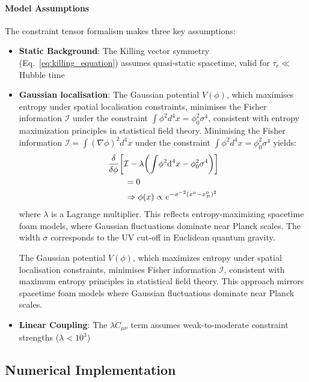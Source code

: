 \documentclass[twocolumn]{article}
\newcommand{\fpit}{\mathcal{P}}
\begin{document}
	\paragraph{Model Assumptions}
	The constraint tensor formalism makes three key assumptions:  
	\begin{itemize}
		\item \textbf{Static Background}: The Killing vector symmetry (Eq.~\ref{eq:killing_equation}) assumes quasi-static spacetime, valid for $\tau_c \ll$ Hubble time  
		\item \textbf{Gaussian localisation}: The Gaussian potential \(V(\phi)\), which maximises entropy under spatial localisation constraints\cite{Padmanabhan2004}, minimises the Fisher information \(\mathcal{I}\) under the constraint \(\int \phi^2 d^4x = \phi_0^2 \sigma^4\), consistent with entropy maximization principles in statistical field theory\cite{jaynes2003}.  Minimising the Fisher information \( \mathcal{I} = \int (\nabla\phi)^2 d^4x \) under the constraint \( \int \phi^2 d^4x = \phi_0^2 \sigma^4 \) yields:
		\begin{equation}
			\begin{split}
				\MoveEqLeft \frac{\delta}{\delta\phi}\biggl[\mathcal{I} - \lambda\biggl(\int\! \phi^2 \mathrm{d}^4x - \phi_0^2 \sigma^4\biggr)\biggr] \\
				&= 0 \\
				&\Rightarrow \phi(x) \propto e^{-\sigma^{-2}(x^\mu - x^\mu_\fpit)^2}
			\end{split}
		\end{equation}
		where \(\lambda\) is a Lagrange multiplier. This reflects entropy-maximizing spacetime foam models\cite{Sorkin2005}, where Gaussian fluctuations dominate near Planck scales. The width \(\sigma\) corresponds to the UV cut-off in Euclidean quantum gravity\cite{Hawking1979}.
		
		The Gaussian potential \(V(\phi)\), which maximizes entropy under spatial localisation constraints\cite{jaynes2003}, minimises Fisher information $\mathcal{I}$, consistent with maximum entropy principles in statistical field theory\cite{jaynes2003}. This approach mirrors spacetime foam models\cite{wheeler1957} where Gaussian fluctuations dominate near Planck scales.
		\item \textbf{Linear Coupling}: The $\lambda C_{\mu\nu}$ term assumes weak-to-moderate constraint strengths ($\lambda < 10^3$)
	\end{itemize}
	
	\subsection{Numerical Implementation}\label{subsec:numerics}
	
\end{document}
